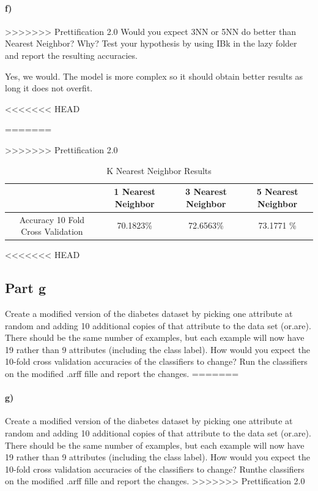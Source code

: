 \documentclass{article}
\begin{document}
\begin{table}[H]
\begin{table}[H]
\begin{table}[H]
\paragraph{f)}
>>>>>>> Prettification 2.0
Would you expect 3NN or 5NN do better than Nearest Neighbor? Why? Test your hypothesis by using IBk in the lazy folder and report the resulting accuracies.

Yes, we would. The model is more complex so it should obtain better results as long it does not overfit. 


<<<<<<< HEAD
\begin{table}[H]
=======
\begin{table}[ht]
>>>>>>> Prettification 2.0
    \begin{center}
    \caption{K Nearest Neighbor Results}
    \begin{tabular}{|c|c|c|c|}
   \hline
        & 1 Nearest Neighbor & 3 Nearest Neighbor  & 5 Nearest Neighbor  \\ \hline
         Accuracy 10 Fold Cross Validation &  70.1823\%&72.6563\% &  73.1771 \%   \\ \hline
       
             
     
    \end{tabular}
    \end{center}
\end{table}

<<<<<<< HEAD
\subsection{Part g}
Create a modified version of the diabetes dataset by picking one attribute at random and adding 10 additional copies of that attribute to the data set (or.are). There should be the same number of examples, but each example will now have 19 rather than 9 attributes (including the class label). How would you expect the 10-fold cross validation accuracies of the classifiers to change? Run the classifiers on the modified .arff fille and report the changes.
=======
\paragraph{g)}
Create a modified version of the diabetes dataset by picking one attribute at random and adding 10 additional copies of that attribute to the data set (or.are). There should be the same number of examples, but each example will now have 19 rather than 9 attributes (including the class label). How would you expect the 10-fold cross validation accuracies of the classifiers to change? Runthe classifiers on the modified .arff fille and report the changes.
>>>>>>> Prettification 2.0


\end{table}
\end{table}
\end{table}
\end{table}
\end{document}
